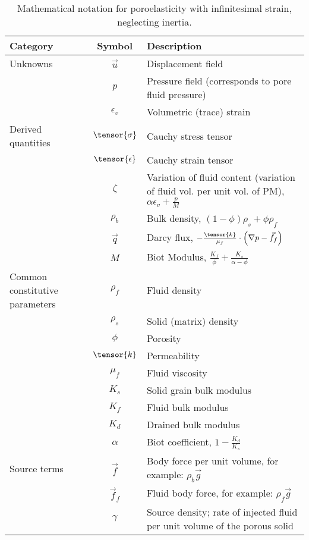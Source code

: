 \begin{table}[htbp]
  \caption{Mathematical notation for poroelasticity with
    infinitesimal strain, neglecting inertia.}
  \label{tab:notation:poroelasticity}
  \begin{tabular}{lcp{3.5in}}
    \toprule
    {\bf Category} & {\bf Symbol} & {\bf Description} \\
    \midrule
    Unknowns           & $\vec{u}$ & Displacement field \\
                       & $p$       & Pressure field (corresponds to pore fluid pressure) \\
                       & $\epsilon_{v}$ & Volumetric (trace) strain \\
    \hline
    Derived quantities & $\tensor{\sigma}$ & Cauchy stress tensor \\
                       & $\tensor{\epsilon}$ & Cauchy strain tensor \\
                       & $\zeta$ & Variation of fluid content (variation of fluid vol. per unit vol. of PM), $\alpha \epsilon_{v} + \frac{p}{M}$ \\
                       & $\rho_{b}$ & Bulk density, $\left(1 - \phi\right) \rho_{s} + \phi \rho_{f}$ \\
                       & $\vec{q}$ & Darcy flux, $-\frac{\tensor{k}}{\mu_{f}} \cdot \left(\nabla p - \vec{f}_{f}\right)$ \\
                       & $M$ & Biot Modulus, $\frac{K_{f}}{\phi} + \frac{K_{s}}{\alpha - \phi}$ \\
    \hline
    Common constitutive parameters & $\rho_{f}$ & Fluid density \\
                       & $\rho_{s}$ & Solid (matrix) density \\
                       & $\phi$ & Porosity \\
                       & $\tensor{k}$ & Permeability \\
                       & $\mu_{f}$ & Fluid viscosity \\
                       & $K_{s}$ & Solid grain bulk modulus \\
                       & $K_{f}$ & Fluid bulk modulus \\
                       & $K_{d}$ & Drained bulk modulus \\
                       & $\alpha$ & Biot coefficient, $1 - \frac{K_{d}}{K_{s}}$ \\
    \hline
    Source terms       & $\vec{f}$ & Body force per unit volume, for example: $\rho_{b} \vec{g}$ \\
                       & $\vec{f}_{f}$ & Fluid body force, for example: $\rho_{f} \vec{g}$ \\
                       & $\gamma$ & Source density; rate of injected fluid per unit volume of the porous solid \\
    \bottomrule
  \end{tabular}
\end{table}\\



